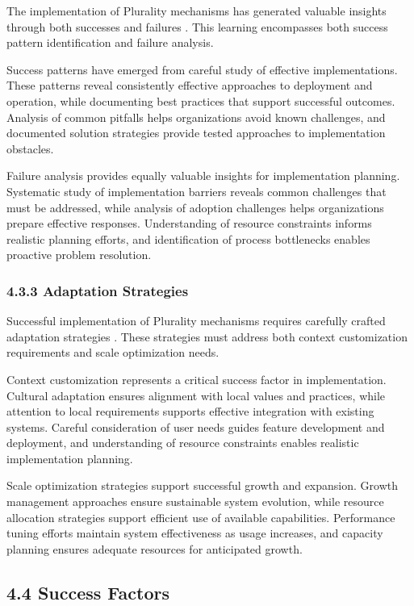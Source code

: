 The implementation of Plurality mechanisms has generated valuable insights through both successes and failures \citep{vtaiwan2023}. This learning encompasses both success pattern identification and failure analysis.

Success patterns have emerged from careful study of effective implementations. These patterns reveal consistently effective approaches to deployment and operation, while documenting best practices that support successful outcomes. Analysis of common pitfalls helps organizations avoid known challenges, and documented solution strategies provide tested approaches to implementation obstacles.

Failure analysis provides equally valuable insights for implementation planning. Systematic study of implementation barriers reveals common challenges that must be addressed, while analysis of adoption challenges helps organizations prepare effective responses. Understanding of resource constraints informs realistic planning efforts, and identification of process bottlenecks enables proactive problem resolution.

\hypertarget{adaptation-strategies}{%
\subsubsection{4.3.3 Adaptation Strategies}\label{adaptation-strategies}}

Successful implementation of Plurality mechanisms requires carefully crafted adaptation strategies \citep{pdis2024}. These strategies must address both context customization requirements and scale optimization needs.

Context customization represents a critical success factor in implementation. Cultural adaptation ensures alignment with local values and practices, while attention to local requirements supports effective integration with existing systems. Careful consideration of user needs guides feature development and deployment, and understanding of resource constraints enables realistic implementation planning.

Scale optimization strategies support successful growth and expansion. Growth management approaches ensure sustainable system evolution, while resource allocation strategies support efficient use of available capabilities. Performance tuning efforts maintain system effectiveness as usage increases, and capacity planning ensures adequate resources for anticipated growth.

\hypertarget{success-factors}{%
\subsection{4.4 Success Factors}\label{success-factors}}

